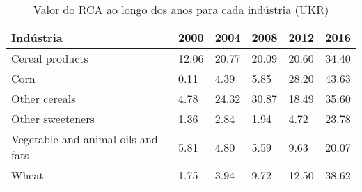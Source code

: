 \begin{table}
\centering
\caption{Valor do RCA ao longo dos anos para cada indústria (UKR)}
\label{tab:ex3-tempo-UKR}
\begin{tabular}{p{6cm}p{1.5cm}p{1.5cm}p{1.5cm}p{1.5cm}p{1.5cm}}
\toprule
                         Indústria &  2000 &  2004 &  2008 &  2012 &  2016 \\
\midrule
                   Cereal products & 12.06 & 20.77 & 20.09 & 20.60 & 34.40 \\
                              Corn &  0.11 &  4.39 &  5.85 & 28.20 & 43.63 \\
                     Other cereals &  4.78 & 24.32 & 30.87 & 18.49 & 35.60 \\
                  Other sweeteners &  1.36 &  2.84 &  1.94 &  4.72 & 23.78 \\
Vegetable and animal oils and fats &  5.81 &  4.80 &  5.59 &  9.63 & 20.07 \\
                             Wheat &  1.75 &  3.94 &  9.72 & 12.50 & 38.62 \\
\bottomrule
\end{tabular}
\end{table}
